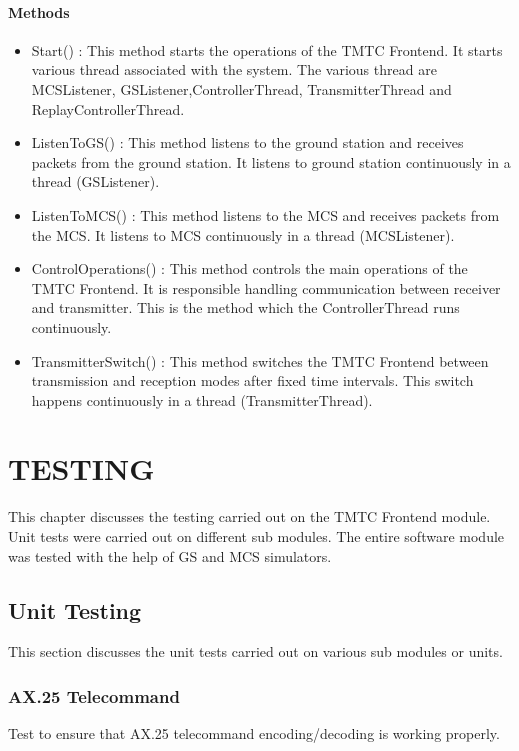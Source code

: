 \documentclass[BTech]{iitmdiss}
\begin{document}
\subsubsection{Methods}
\begin{itemize}
\item Start() : This method starts the operations of the TMTC Frontend. It starts various thread associated with the system. The various thread are MCSListener, GSListener,ControllerThread, TransmitterThread and ReplayControllerThread.
\item ListenToGS() : This method listens to the ground station and receives packets from the ground station. It listens to ground station continuously in a thread (GSListener).
\item ListenToMCS() : This method listens to the MCS and receives packets from the MCS. It listens to MCS continuously in a thread (MCSListener).
\item ControlOperations() : This method controls the main operations of the TMTC Frontend. It is responsible handling communication between receiver and transmitter. This is the method which the ControllerThread runs continuously. 
\item TransmitterSwitch() : This method switches the TMTC Frontend between transmission and reception modes after fixed time intervals. This switch happens continuously in  a thread (TransmitterThread).
\end{itemize}

\chapter{TESTING}
This chapter discusses the testing carried out on the TMTC Frontend module. Unit tests were carried out on different sub modules. The entire software module was tested with the help of GS and MCS simulators.
\section{Unit Testing}
This section discusses the unit tests carried out on various sub modules or units.
\subsection{AX.25 Telecommand}
Test to ensure that AX.25 telecommand encoding/decoding is working properly.
\end{document}
